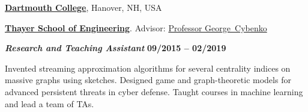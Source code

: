 \href{https://dartmouth.edu}{\textbf{Dartmouth College}},
Hanover, NH, USA

\href{https://engineering.dartmouth.edu/}{\textbf{Thayer School of Engineering}}.
Advisor:               
\href{http://www.dartmouth.edu/~gvc/}
{Professor George~Cybenko}

\vspace{-0.5em}

\begin{outerlist}

\vspace{-0.5em}

\item[] \textbf{\textit{Research and Teaching Assistant}}%
\hfill \textbf{09/2015 -- 02/2019}

\vspace{-0.5em}

Invented streaming approximation algorithms for several centrality indices on massive graphs using sketches.
Designed game and graph-theoretic models  for advanced persistent threats in cyber defense.
Taught courses in machine learning and lead a team of TAs.

\end{outerlist}
